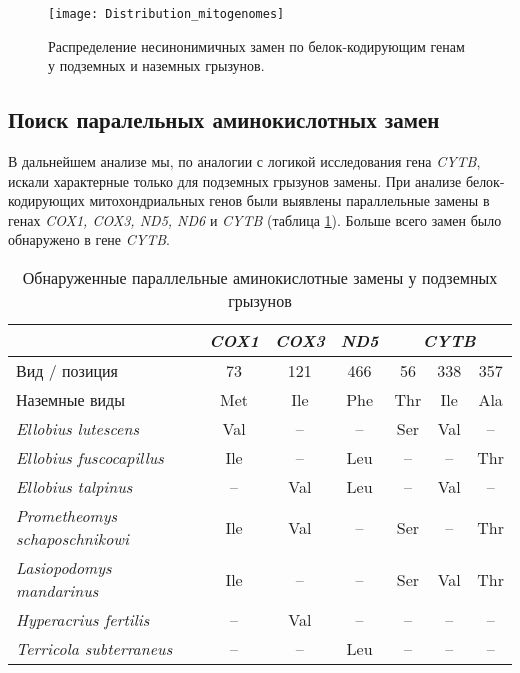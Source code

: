 \begin{figure}[h!]
	\begin{center}
		\texttt{[image: Distribution\_mitogenomes]}
	\end{center}
	\caption{Распределение несинонимичных замен по белок-кодирующим генам у подземных и наземных грызунов.}\label{manhattan_NS}
\end{figure}


\subsection{Поиск паралельных аминокислотных замен}

В дальнейшем анализе мы, по аналогии с логикой исследования гена \textit{CYTB}, искали характерные только для подземных грызунов замены. При анализе белок-кодирующих митохондриальных генов были выявлены параллельные замены в генах \textit{COX1, COX3, ND5, ND6} и \textit{CYTB} (таблица \ref{Underground_subs}). Больше всего замен было обнаружено в гене \textit{CYTB}. 

\begin{table}[h!]
	\caption{Обнаруженные параллельные аминокислотные замены у подземных грызунов}\label{Underground_subs}
	\vspace{5mm}
\begin{tabular}{|l|c|c|c|c|c|c|}
	\hline
	& \textit{COX1} & \textit{COX3} & \textit{ND5} & \multicolumn{3}{c|}{\textit{CYTB}} \\ \hline
	Вид   / позиция              & 73   & 121  & 466 & 56      & 338    & 357    \\ \hline
	Наземные виды                & Met  & Ile  & Phe & Thr     & Ile    & Ala    \\ \hline
	\textit{Ellobius lutescens}          & Val  & --   & --  & Ser     & Val    & --     \\ \hline
	\textit{Ellobius fuscocapillus}       & Ile  & --   & Leu & --      & --     & Thr    \\ \hline
	\textit{Ellobius talpinus}            & --   & Val  & Leu & --      & Val    & --     \\ \hline
	\textit{Prometheomys schaposchnikowi} & Ile  & Val  & --  & Ser     & --     & Thr    \\ \hline
	\textit{Lasiopodomys mandarinus}      & Ile  & --   & --  & Ser     & Val    & Thr    \\ \hline
	\textit{Hyperacrius fertilis}         & --   & Val  & --  & --      & --     & --     \\ \hline
	\textit{Terricola subterraneus}       & --   & --   & Leu & --      & --     & --     \\ \hline
\end{tabular}	
\end{table}



